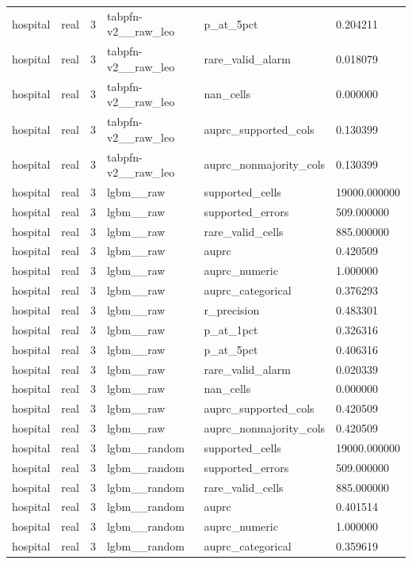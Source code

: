 \begin{tabular}{llllll}
hospital & real & 3 & tabpfn-v2\_\_raw\_leo & p\_at\_5pct & 0.204211 \\
hospital & real & 3 & tabpfn-v2\_\_raw\_leo & rare\_valid\_alarm & 0.018079 \\
hospital & real & 3 & tabpfn-v2\_\_raw\_leo & nan\_cells & 0.000000 \\
hospital & real & 3 & tabpfn-v2\_\_raw\_leo & auprc\_supported\_cols & 0.130399 \\
hospital & real & 3 & tabpfn-v2\_\_raw\_leo & auprc\_nonmajority\_cols & 0.130399 \\
hospital & real & 3 & lgbm\_\_raw & supported\_cells & 19000.000000 \\
hospital & real & 3 & lgbm\_\_raw & supported\_errors & 509.000000 \\
hospital & real & 3 & lgbm\_\_raw & rare\_valid\_cells & 885.000000 \\
hospital & real & 3 & lgbm\_\_raw & auprc & 0.420509 \\
hospital & real & 3 & lgbm\_\_raw & auprc\_numeric & 1.000000 \\
hospital & real & 3 & lgbm\_\_raw & auprc\_categorical & 0.376293 \\
hospital & real & 3 & lgbm\_\_raw & r\_precision & 0.483301 \\
hospital & real & 3 & lgbm\_\_raw & p\_at\_1pct & 0.326316 \\
hospital & real & 3 & lgbm\_\_raw & p\_at\_5pct & 0.406316 \\
hospital & real & 3 & lgbm\_\_raw & rare\_valid\_alarm & 0.020339 \\
hospital & real & 3 & lgbm\_\_raw & nan\_cells & 0.000000 \\
hospital & real & 3 & lgbm\_\_raw & auprc\_supported\_cols & 0.420509 \\
hospital & real & 3 & lgbm\_\_raw & auprc\_nonmajority\_cols & 0.420509 \\
hospital & real & 3 & lgbm\_\_random & supported\_cells & 19000.000000 \\
hospital & real & 3 & lgbm\_\_random & supported\_errors & 509.000000 \\
hospital & real & 3 & lgbm\_\_random & rare\_valid\_cells & 885.000000 \\
hospital & real & 3 & lgbm\_\_random & auprc & 0.401514 \\
hospital & real & 3 & lgbm\_\_random & auprc\_numeric & 1.000000 \\
hospital & real & 3 & lgbm\_\_random & auprc\_categorical & 0.359619 \\

\end{tabular}
